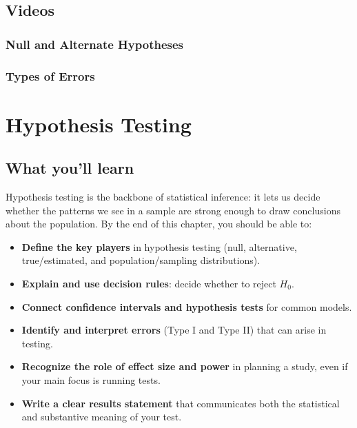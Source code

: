 \documentclass[
  letterpaper,
  DIV=11,
  numbers=noendperiod]{scrreprt}
\providecommand{\tightlist}{%
  \setlength{\itemsep}{0pt}\setlength{\parskip}{0pt}}
\begin{document}
\section{Videos}\label{videos-3}

\subsection{Null and Alternate
Hypotheses}\label{null-and-alternate-hypotheses}

\subsection{Types of Errors}\label{types-of-errors}


\chapter{Hypothesis Testing}\label{hypothesis-testing}

\section{What you'll learn}\label{what-youll-learn}

Hypothesis testing is the backbone of statistical inference: it lets us
decide whether the patterns we see in a sample are strong enough to draw
conclusions about the population. By the end of this chapter, you should
be able to:

\begin{itemize}
\tightlist
\item
  \textbf{Define the key players} in hypothesis testing (null,
  alternative, true/estimated, and population/sampling distributions).
\item
  \textbf{Explain and use decision rules}: decide whether to reject
  \(H_0\).
\item
  \textbf{Connect confidence intervals and hypothesis tests} for common
  models.
\item
  \textbf{Identify and interpret errors} (Type I and Type II) that can
  arise in testing.
\item
  \textbf{Recognize the role of effect size and power} in planning a
  study, even if your main focus is running tests.
\item
  \textbf{Write a clear results statement} that communicates both the
  statistical and substantive meaning of your test.
\end{itemize}
\end{document}
